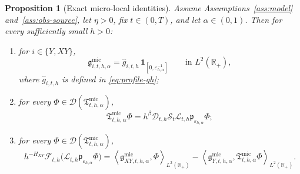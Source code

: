 \documentclass[11pt,a4paper]{amsart}
\theoremstyle{plain}
\newtheorem{proposition}[theorem]{Proposition}
\theoremstyle{definition}
\theoremstyle{remark}
\newcommand{\R}{\mathbb{R}}
\newcommand{\one}{\mathbf 1}
\begin{document}
\begin{proposition}[Exact micro-local identities]
\label{prop:micro-local}
Assume Assumptions~\ref{ass:model} and~\ref{ass:obs-source}, let \(\eta>0\), fix \(t\in(0,T)\),
and let \(\alpha\in(0,1)\). Then for every sufficiently small \(h>0\):
\begin{enumerate}[label=(\roman*)]
\item for \(i\in\{Y,XY\}\),
\begin{equation}\label{eq:micro-profile-trunc}
\mathfrak g_{i,t,h,\alpha}^{\mathrm{mic}}
=
\widehat g_{i,t,h}\,\one_{[0,\varepsilon_{h,\alpha}^{-1}]}
\qquad\text{in }L^2(\R_+),
\end{equation}
where \(\widehat g_{i,t,h}\) is defined in \eqref{eq:profile-gh};
 \item for every \(\Phi\in\mathcal D(\mathfrak T_{t,h,\alpha}^{\mathrm{mic}})\),
\begin{equation}\label{eq:micro-transfer-exact}
\mathfrak T_{t,h,\alpha}^{\mathrm{mic}}\Phi
=
h^\beta
\mathcal D_{t,h}\mathcal S_t\mathcal L_{t,h}\mathfrak p_{\varepsilon_{h,\alpha}}\Phi;
\end{equation}
\item for every \(\Phi\in\mathcal D(\mathfrak T_{t,h,\alpha}^{\mathrm{mic}})\),
\begin{equation}\label{eq:micro-functional}
h^{-H_{XY}}
\mathcal F_{t,h}\bigl(\mathcal L_{t,h}\mathfrak p_{\varepsilon_{h,\alpha}}\Phi\bigr)
=
\left\langle
\mathfrak g_{XY,t,h,\alpha}^{\mathrm{mic}},\Phi
\right\rangle_{L^2(\R_+)}
-
\left\langle
\mathfrak g_{Y,t,h,\alpha}^{\mathrm{mic}},
\mathfrak T_{t,h,\alpha}^{\mathrm{mic}}\Phi
\right\rangle_{L^2(\R_+)}.
\end{equation}
\end{enumerate}
\end{proposition}
\end{document}
